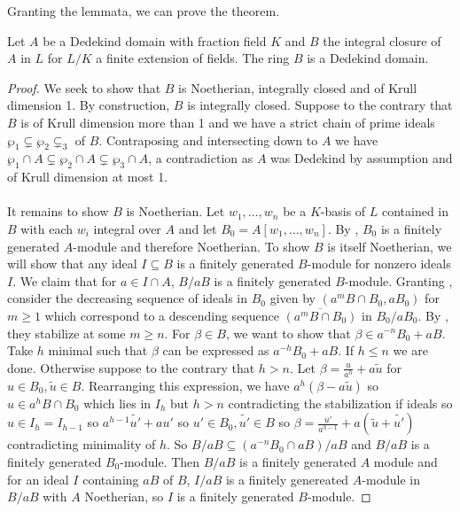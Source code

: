 Granting the lemmata, we can prove the theorem. 
\begin{theorem}\label{thm: integral closure is Dedekind}
  Let $A$ be a Dedekind domain with fraction field $K$ and $B$ the integral closure of $A$ in $L$ for $L/K$ a finite extension of fields. The ring $B$ is a Dedekind domain. 
\end{theorem}
\begin{proof}
  We seek to show that $B$ is Noetherian, integrally closed and of Krull dimension 1. By construction, $B$ is integrally closed. Suppose to the contrary that $B$ is of Krull dimension more than 1 and we have a strict chain of prime ideals $\wp_{1}\subsetneq\wp_{2}\subsetneq_{3}$ of $B$. Contraposing  and intersecting down to $A$ we have $\wp_{1}\cap A\subsetneq\wp_{2}\cap A\subsetneq\wp_{3}\cap A$, a contradiction as $A$ was Dedekind by assumption and of Krull dimension at most 1. \\\\
  It remains to show $B$ is Noetherian. Let $w_{1},\dots,w_{n}$ be a $K$-basis of $L$ contained in $B$ with each $w_{i}$ integral over $A$ and let $B_{0}=A[w_{1},\dots,w_{n}]$. By , $B_{0}$ is a finitely generated $A$-module and therefore Noetherian. To show $B$ is itself Noetherian, we will show that any ideal $I\subseteq B$ is a finitely generated $B$-module for nonzero ideals $I$. We claim that for $a\in I\cap A$, $B/aB$ is a finitely generated $B$-module. Granting , consider the decreasing sequence of ideals in $B_{0}$ given by $(a^{m}B\cap B_{0},aB_{0})$ for $m\geq 1$ which correspond to a descending sequence $\overline{(a^{m}B\cap B_{0})}$ in $B_{0}/aB_{0}$. By , they stabilize at some $m\geq n$. For $\beta\in B$, we want to show that $\beta\in a^{-n}B_{0}+aB$. Take $h$ minimal such that $\beta$ can be expressed as $a^{-h}B_{0}+aB$. If $h\leq n$ we are done. Otherwise suppose to the contrary that $h>n$. Let $\beta=\frac{u}{a^{h}}+a\widetilde{u}$ for $u\in B_{0},\widetilde{u}\in B$. Rearranging this expression, we have $a^{h}(\beta-a\widetilde{u})$ so $u\in a^{h}B\cap B_{0}$ which lies in $I_{h}$ but $h>n$ contradicting the stabilization if ideals so $u\in I_{h}=I_{h-1}$ so $a^{h-1}\widetilde{u'}+au'$ so $u'\in B_{0},\widetilde{u'}\in B$ so $\beta=\frac{u'}{a^{h-1}}+a(\widetilde{u}+\widetilde{u'})$ contradicting minimality of $h$. So $B/aB\subseteq(a^{-n}B_{0}\cap aB)/aB$ and $B/aB$ is a finitely generated $B_{0}$-module. Then $B/aB$ is a finitely generated $A$ module and for an ideal $I$ containing $aB$ of $B$, $I/aB$ is a finitely genereated $A$-module in $B/aB$ with $A$ Noetherian, so $I$ is a finitely generated $B$-module. 
\end{proof}